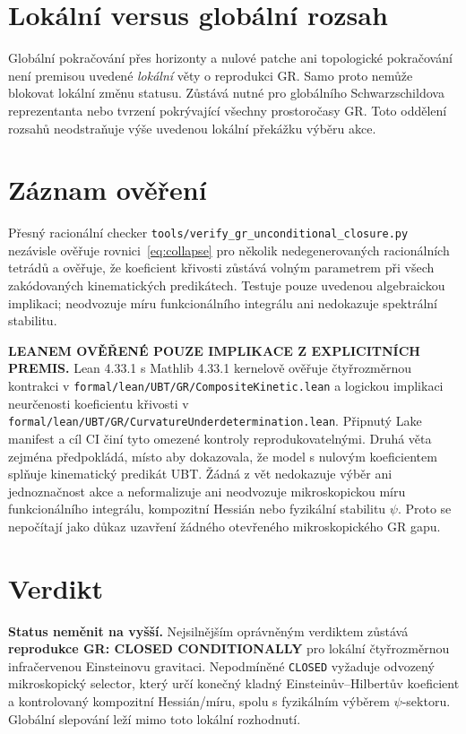 \documentclass[11pt,a4paper]{article}
\begin{document}
\section{Lokální versus globální rozsah}
Globální pokračování přes horizonty a nulové patche ani topologické
pokračování není premisou uvedené \emph{lokální} věty o reprodukci GR. Samo
proto nemůže blokovat lokální změnu statusu. Zůstává nutné pro globálního
Schwarzschildova reprezentanta nebo tvrzení pokrývající všechny prostoročasy
GR. Toto oddělení rozsahů neodstraňuje výše uvedenou lokální překážku výběru
akce.

\section{Záznam ověření}
Přesný racionální checker
\texttt{tools/verify\_gr\_unconditional\_closure.py} nezávisle ověřuje
rovnici~\eqref{eq:collapse} pro několik nedegenerovaných racionálních tetrádů
a ověřuje, že koeficient křivosti zůstává volným parametrem při všech
zakódovaných kinematických predikátech. Testuje pouze uvedenou algebraickou
implikaci; neodvozuje míru funkcionálního integrálu ani nedokazuje spektrální
stabilitu.

\textbf{LEANEM OVĚŘENÉ POUZE IMPLIKACE Z EXPLICITNÍCH PREMIS.} Lean 4.33.1
s Mathlib 4.33.1 kernelově ověřuje čtyřrozměrnou kontrakci v
\texttt{formal/lean/UBT/GR/CompositeKinetic.lean} a logickou implikaci
neurčenosti koeficientu křivosti v
\texttt{formal/lean/UBT/GR/CurvatureUnderdetermination.lean}. Připnutý Lake
manifest a cíl CI činí tyto omezené kontroly reprodukovatelnými. Druhá věta
zejména předpokládá, místo aby dokazovala, že model s nulovým koeficientem
splňuje kinematický predikát UBT. Žádná z vět nedokazuje výběr ani jednoznačnost
akce a neformalizuje ani neodvozuje mikroskopickou míru funkcionálního
integrálu, kompozitní Hessián nebo fyzikální stabilitu $\psi$. Proto se
nepočítají jako důkaz uzavření žádného otevřeného mikroskopického GR gapu.

\section{Verdikt}
\begin{tcolorbox}[colback=yellow!7!white,colframe=yellow!55!black,title=Rozhodnutí o statusu]
\textbf{Status neměnit na vyšší.} Nejsilnějším oprávněným verdiktem zůstává
\textbf{reprodukce GR: CLOSED CONDITIONALLY} pro lokální čtyřrozměrnou
infračervenou Einsteinovu gravitaci. Nepodmíněné \texttt{CLOSED} vyžaduje
odvozený mikroskopický selector, který určí konečný kladný
Einsteinův--Hilbertův koeficient a kontrolovaný kompozitní Hessián/míru, spolu
s fyzikálním výběrem $\psi$-sektoru. Globální slepování leží mimo toto lokální
rozhodnutí.
\end{tcolorbox}
\end{document}
